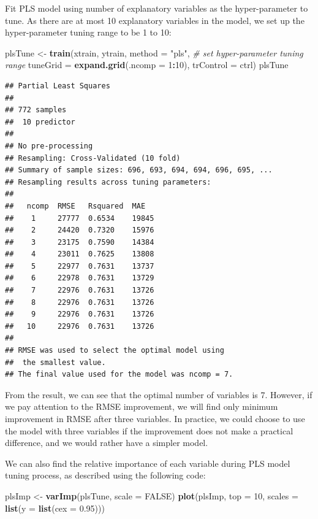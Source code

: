 \documentclass[12pt,]{krantz}
\makeatletter
\newenvironment{Shaded}{\begin{snugshade}}{\end{snugshade}}
\newcommand{\CommentTok}[1]{\textcolor[rgb]{0.37,0.37,0.37}{\textit{#1}}}
\newcommand{\DataTypeTok}[1]{\textcolor[rgb]{0.27,0.27,0.27}{#1}}
\newcommand{\DecValTok}[1]{\textcolor[rgb]{0.06,0.06,0.06}{#1}}
\newcommand{\FloatTok}[1]{\textcolor[rgb]{0.06,0.06,0.06}{#1}}
\newcommand{\KeywordTok}[1]{\textcolor[rgb]{0.27,0.27,0.27}{\textbf{#1}}}
\newcommand{\NormalTok}[1]{#1}
\newcommand{\OperatorTok}[1]{\textcolor[rgb]{0.43,0.43,0.43}{\textbf{#1}}}
\newcommand{\OtherTok}[1]{\textcolor[rgb]{0.37,0.37,0.37}{#1}}
\newcommand{\StringTok}[1]{\textcolor[rgb]{0.5,0.5,0.5}{#1}}
\newenvironment{kframe}{%
\medskip{}
\setlength{\fboxsep}{.8em}
 \def\at@end@of@kframe{}%
 \ifinner\ifhmode%
  \def\at@end@of@kframe{\end{minipage}}%
  \begin{minipage}{\columnwidth}%
 \fi\fi%
 \def\FrameCommand##1{\hskip\@totalleftmargin \hskip-\fboxsep
 \colorbox{shadecolor}{##1}\hskip-\fboxsep
     \hskip-\linewidth \hskip-\@totalleftmargin \hskip\columnwidth}%
 \MakeFramed {\advance\hsize-\width
   \@totalleftmargin\z@ \linewidth\hsize
   \@setminipage}}%
 {\par\unskip\endMakeFramed%
 \at@end@of@kframe}
\renewenvironment{Shaded}{\begin{kframe}}{\end{kframe}}
\makeatother
\begin{document}
Fit PLS model using number of explanatory variables as the hyper-parameter to tune. As there are at most 10 explanatory variables in the model, we set up the hyper-parameter tuning range to be 1 to 10:

\begin{Shaded}
\begin{Highlighting}[]
\NormalTok{plsTune <-}\StringTok{ }\KeywordTok{train}\NormalTok{(xtrain, ytrain, }
                 \DataTypeTok{method =} \StringTok{"pls"}\NormalTok{, }
                 \CommentTok{# set hyper-parameter tuning range}
                 \DataTypeTok{tuneGrid =} \KeywordTok{expand.grid}\NormalTok{(}\DataTypeTok{.ncomp =} \DecValTok{1}\OperatorTok{:}\DecValTok{10}\NormalTok{),}
                 \DataTypeTok{trControl =}\NormalTok{ ctrl)}
\NormalTok{plsTune}
\end{Highlighting}
\end{Shaded}

\begin{verbatim}
## Partial Least Squares 
## 
## 772 samples
##  10 predictor
## 
## No pre-processing
## Resampling: Cross-Validated (10 fold) 
## Summary of sample sizes: 696, 693, 694, 694, 696, 695, ... 
## Resampling results across tuning parameters:
## 
##   ncomp  RMSE   Rsquared  MAE  
##    1     27777  0.6534    19845
##    2     24420  0.7320    15976
##    3     23175  0.7590    14384
##    4     23011  0.7625    13808
##    5     22977  0.7631    13737
##    6     22978  0.7631    13729
##    7     22976  0.7631    13726
##    8     22976  0.7631    13726
##    9     22976  0.7631    13726
##   10     22976  0.7631    13726
## 
## RMSE was used to select the optimal model using
##  the smallest value.
## The final value used for the model was ncomp = 7.
\end{verbatim}

From the result, we can see that the optimal number of variables is 7. However, if we pay attention to the RMSE improvement, we will find only minimum improvement in RMSE after three variables. In practice, we could choose to use the model with three variables if the improvement does not make a practical difference, and we would rather have a simpler model. 

We can also find the relative importance of each variable during PLS model tuning process, as described using the following code: 

\begin{Shaded}
\begin{Highlighting}[]
\NormalTok{plsImp <-}\StringTok{ }\KeywordTok{varImp}\NormalTok{(plsTune, }\DataTypeTok{scale =} \OtherTok{FALSE}\NormalTok{)}
\KeywordTok{plot}\NormalTok{(plsImp, }\DataTypeTok{top =} \DecValTok{10}\NormalTok{, }\DataTypeTok{scales =} \KeywordTok{list}\NormalTok{(}\DataTypeTok{y =} \KeywordTok{list}\NormalTok{(}\DataTypeTok{cex =} \FloatTok{0.95}\NormalTok{)))}
\end{Highlighting}
\end{Shaded}
\end{document}
